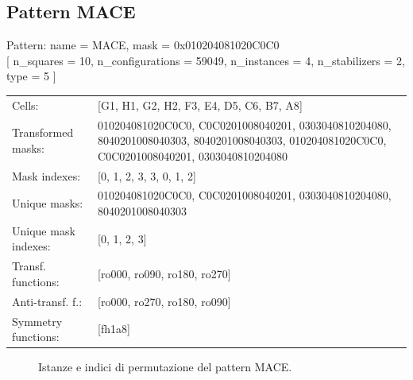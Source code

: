 \newpage

\subsection{Pattern MACE}

\begin{tcolorbox}[sharp corners, fontupper=\ttfamily\small, colback=white]
  \noindent Pattern: name = MACE, mask = 0x010204081020C0C0\\
  {[} n\_squares = 10, n\_configurations = 59049,
  n\_instances = 4, n\_stabilizers = 2, type = 5 { ]}\\[1.0ex]
  \begin{tabularx}{\textwidth}{@{} p{3.5cm} X @{}}
    Cells:               & {[}G1, H1, G2, H2, F3, E4, D5, C6, B7, A8{]}\\[0.5ex]
    Transformed masks:   & 010204081020C0C0, C0C0201008040201, 0303040810204080, 8040201008040303, 8040201008040303, 010204081020C0C0, C0C0201008040201, 0303040810204080\\[0.5ex]
    Mask indexes:        & {[}0, 1, 2, 3, 3, 0, 1, 2{]}\\[0.5ex]
    Unique masks:        & 010204081020C0C0, C0C0201008040201, 0303040810204080, 8040201008040303\\[0.5ex]
    Unique mask indexes: & {[}0, 1, 2, 3{]}\\[0.5ex]
    Transf. functions:   & {[}ro000, ro090, ro180, ro270{]}\\[0.5ex]
    Anti-transf. f.:     & {[}ro000, ro270, ro180, ro090{]}\\[0.5ex]
    Symmetry functions:  & {[}fh1a8{]}\\[0.5ex]
  \end{tabularx}
\end{tcolorbox}

\begin{figure}[htbp]
  \centering
   \hfill
   \hfill
   \hfill
  \vspace{0.3cm}
   \hfill
   \hfill
   \hfill
  \caption{Istanze e indici di permutazione del pattern MACE.}
\end{figure}


